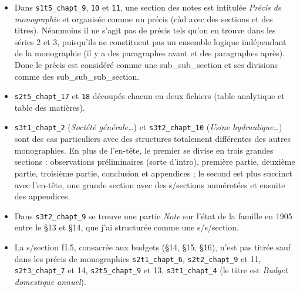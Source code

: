 \begin{itemize}
\item
  Dans \texttt{s1t5\_chapt\_9}, \texttt{10} et \texttt{11}, une section des notes est intitulée
  \textit{Précis de monographie} et organisée comme un précis (càd avec des
  sections et des titres). Néanmoins il ne s'agit pas de précis tels
  qu'on en trouve dans les séries 2 et 3, puisqu'ils ne constituent pas
  un ensemble logique indépendant de la monographie (il y a des
  paragraphes avant et des paragraphes après). Donc le précis est
  considéré comme une sub\_sub\_section et ses divisions comme des
  sub\_sub\_sub\_section.
\item
  \texttt{s2t5\_chapt\_17} et \texttt{18} découpés chacun en deux fichiers (table
  analytique et table des matières).
\item
  \texttt{s3t1\_chapt\_2} (\textit{Société générale\ldots{}}) et \texttt{s3t2\_chapt\_10}
  (\textit{Usine hydraulique\ldots{}}) sont des cas particuliers avec des
  structures totalement différentes des autres monographies. En plus de
  l'en-tête, le premier se divise en trois grandes sections :
  observations préliminaires (sorte d'intro), première partie, deuxième
  partie, troisième partie, conclusion et appendices ; le second est
  plus succinct avec l'en-tête, une grande section avec des s/sections
  numérotées et ensuite des appendices.
\item
  Dans \texttt{s3t2\_chapt\_9} se trouve une partie \textit{Note} sur l'état de la
  famille en 1905 entre le §13 et §14, que j'ai structurée comme une
  s/s/section.
\item
  La s/section II.5, consacrée aux budgets (§14, §15, §16), n'est pas
  titrée sauf dans les précis de monographies \texttt{s2t1\_chapt\_6},
  \texttt{s2t2\_chapt\_9} et 11, \texttt{s2t3\_chapt\_7} et 14, \texttt{s2t5\_chapt\_9} et 13,
  \texttt{s3t1\_chapt\_4} (le titre est \textit{Budget domestique annuel}).
\end{itemize}